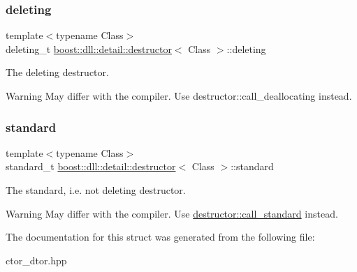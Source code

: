 \subsubsection{\texorpdfstring{deleting}{deleting}}
{\footnotesize\ttfamily template$<$typename Class$>$ \\
deleting\+\_\+t \hyperlink{a01360}{boost\+::dll\+::detail\+::destructor}$<$ Class $>$\+::deleting}



The deleting destructor. 

\begin{DoxyWarning}{Warning}
May differ with the compiler. Use destructor\+::call\+\_\+deallocating instead. 
\end{DoxyWarning}
\mbox{\label{a01360_a5c588780f2142ca3492ea78c62fe472c}} 
\subsubsection{\texorpdfstring{standard}{standard}}
{\footnotesize\ttfamily template$<$typename Class$>$ \\
standard\+\_\+t \hyperlink{a01360}{boost\+::dll\+::detail\+::destructor}$<$ Class $>$\+::standard}



The standard, i.\+e. not deleting destructor. 

\begin{DoxyWarning}{Warning}
May differ with the compiler. Use \hyperlink{a01360_a95d55018849080c7d4c771b564e9b04e}{destructor\+::call\+\_\+standard} instead. 
\end{DoxyWarning}


The documentation for this struct was generated from the following file\+:\begin{DoxyCompactItemize}
\item 
ctor\+\_\+dtor.\+hpp\end{DoxyCompactItemize}
